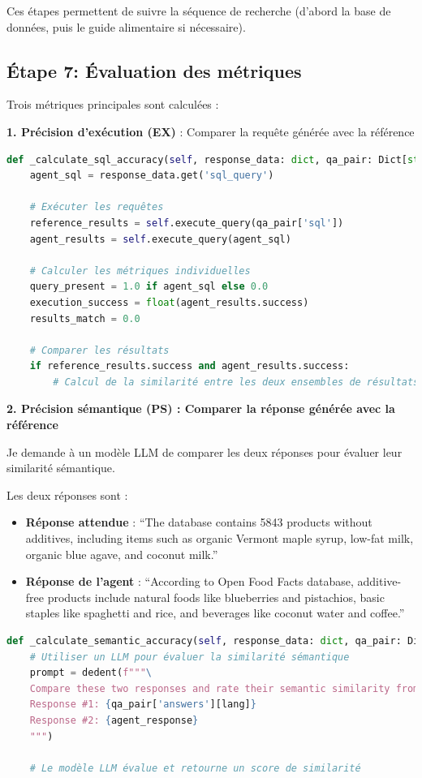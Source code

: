 \documentclass[a4paper,11pt]{article}
\begin{document}
Ces étapes permettent de suivre la séquence de recherche (d'abord la base de données, puis le guide alimentaire si nécessaire).

\subsection*{Étape 7: Évaluation des métriques}

Trois métriques principales sont calculées :

\textbf{1. Précision d'exécution (EX)} : Comparer la requête générée avec la référence

\begin{lstlisting}[language=Python, caption=Calcul de la précision d'exécution]
def _calculate_sql_accuracy(self, response_data: dict, qa_pair: Dict[str, Any]) -> float:
    agent_sql = response_data.get('sql_query')
    
    # Exécuter les requêtes
    reference_results = self.execute_query(qa_pair['sql'])
    agent_results = self.execute_query(agent_sql)

    # Calculer les métriques individuelles
    query_present = 1.0 if agent_sql else 0.0
    execution_success = float(agent_results.success)
    results_match = 0.0

    # Comparer les résultats
    if reference_results.success and agent_results.success:
        # Calcul de la similarité entre les deux ensembles de résultats
\end{lstlisting}

\newpage
\textbf{2. Précision sémantique (PS) : Comparer la réponse générée avec la référence}

Je demande à un modèle LLM de comparer les deux réponses pour évaluer leur similarité sémantique.

Les deux réponses sont : 

\begin{itemize}
  \item \textbf{Réponse attendue} : ``The database contains 5843 products without additives, including items such as organic Vermont maple syrup, low-fat milk, organic blue agave, and coconut milk.''
  \item \textbf{Réponse de l'agent} : ``According to Open Food Facts database, additive-free products include natural foods like blueberries and pistachios, basic staples like spaghetti and rice, and beverages like coconut water and coffee.''
\end{itemize}

\begin{lstlisting}[language=Python, caption=Calcul de la précision sémantique]
def _calculate_semantic_accuracy(self, response_data: dict, qa_pair: Dict, lang: str) -> float:
    # Utiliser un LLM pour évaluer la similarité sémantique
    prompt = dedent(f"""\
    Compare these two responses and rate their semantic similarity from 0 to 1:
    Response #1: {qa_pair['answers'][lang]}
    Response #2: {agent_response}
    """)
    
    # Le modèle LLM évalue et retourne un score de similarité
\end{lstlisting}
\end{document}

